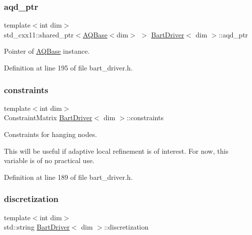 \subsubsection{\texorpdfstring{aqd\+\_\+ptr}{aqd\_ptr}}
{\footnotesize\ttfamily template$<$int dim$>$ \\
std\+\_\+cxx11\+::shared\+\_\+ptr$<$\hyperlink{class_a_q_base}{A\+Q\+Base}$<$dim$>$ $>$ \hyperlink{class_bart_driver}{Bart\+Driver}$<$ dim $>$\+::aqd\+\_\+ptr\hspace{0.3cm}{\ttfamily [private]}}



Pointer of \hyperlink{class_a_q_base}{A\+Q\+Base} instance. 



Definition at line 195 of file bart\+\_\+driver.\+h.

\mbox{\label{class_bart_driver_a2414c8e66212bb95c86f1c70db4a4099}} 
\subsubsection{\texorpdfstring{constraints}{constraints}}
{\footnotesize\ttfamily template$<$int dim$>$ \\
Constraint\+Matrix \hyperlink{class_bart_driver}{Bart\+Driver}$<$ dim $>$\+::constraints\hspace{0.3cm}{\ttfamily [private]}}



Constraints for hanging nodes. 

This will be useful if adaptive local refinement is of interest. For now, this variable is of no practical use. 

Definition at line 189 of file bart\+\_\+driver.\+h.

\mbox{\label{class_bart_driver_a75cc884c6895beca3d3861ca226b4a3f}} 
\subsubsection{\texorpdfstring{discretization}{discretization}}
{\footnotesize\ttfamily template$<$int dim$>$ \\
std\+::string \hyperlink{class_bart_driver}{Bart\+Driver}$<$ dim $>$\+::discretization\hspace{0.3cm}{\ttfamily [private]}}



